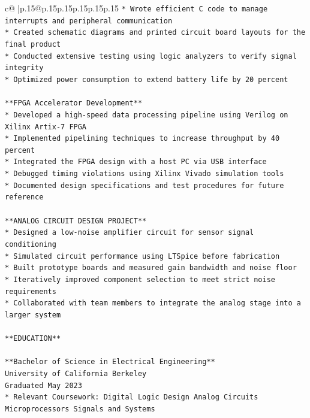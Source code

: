 \documentclass{article}
\begin{document}
{\begin{supertabular}{c@{$\;$}|p{.15\linewidth}@{}p{.15\linewidth}p{.15\linewidth}p{.15\linewidth}p{.15\linewidth}p{.15\linewidth}}
{{{\texttt{*   Wrote efficient C code to manage interrupts and peripheral communication} \\
\texttt{*   Created schematic diagrams and printed circuit board layouts for the final product} \\
\texttt{*   Conducted extensive testing using logic analyzers to verify signal integrity} \\
\texttt{*   Optimized power consumption to extend battery life by 20 percent} \\
\\ 
\texttt{**FPGA Accelerator Development**} \\
\texttt{*   Developed a high{-}speed data processing pipeline using Verilog on Xilinx Artix{-}7 FPGA} \\
\texttt{*   Implemented pipelining techniques to increase throughput by 40 percent} \\
\texttt{*   Integrated the FPGA design with a host PC via USB interface} \\
\texttt{*   Debugged timing violations using Xilinx Vivado simulation tools} \\
\texttt{*   Documented design specifications and test procedures for future reference} \\
\\ 
\texttt{**ANALOG CIRCUIT DESIGN PROJECT**} \\
\texttt{*   Designed a low{-}noise amplifier circuit for sensor signal conditioning} \\
\texttt{*   Simulated circuit performance using LTSpice before fabrication} \\
\texttt{*   Built prototype boards and measured gain bandwidth and noise floor} \\
\texttt{*   Iteratively improved component selection to meet strict noise requirements} \\
\texttt{*   Collaborated with team members to integrate the analog stage into a larger system} \\
\\ 
\texttt{**EDUCATION**} \\
\\ 
\texttt{**Bachelor of Science in Electrical Engineering**} \\
\texttt{University of California Berkeley} \\
\texttt{Graduated May 2023} \\
\texttt{*   Relevant Coursework: Digital Logic Design Analog Circuits Microprocessors Signals and Systems} \\
}}}
\end{supertabular}}
\end{document}
